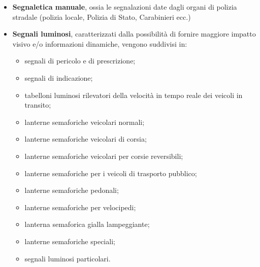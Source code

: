 \begin{itemize}

\item \textbf{Segnaletica manuale}, ossia le segnalazioni date dagli organi di polizia stradale (polizia locale, Polizia di Stato, Carabinieri ecc.)

\item \textbf{Segnali luminosi}, caratterizzati dalla possibilità di fornire maggiore impatto visivo e/o informazioni dinamiche, vengono suddivisi in:
\begin{itemize}
	\item segnali di pericolo e di prescrizione;
	\item segnali di indicazione;
	\item tabelloni luminosi rilevatori della velocità in tempo reale dei veicoli in transito;
	\item lanterne semaforiche veicolari normali;
	\item lanterne semaforiche veicolari di corsia;
	\item lanterne semaforiche veicolari per corsie reversibili;
	\item lanterne semaforiche per i veicoli di trasporto pubblico;
	\item lanterne semaforiche pedonali;
	\item lanterne semaforiche per velocipedi;
	\item lanterna semaforica gialla lampeggiante;
	\item lanterne semaforiche speciali;
	\item segnali luminosi particolari.


\end{itemize}
\end{itemize}
